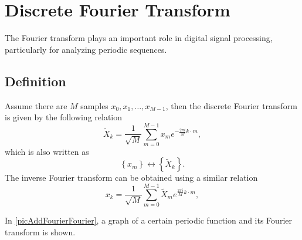 \section{Discrete Fourier Transform}
\label{AddFourier}

The Fourier transform plays an important role in digital signal processing, particularly for analyzing periodic sequences.
\subsection{Definition}
\begin{definition}
Assume there are $M$ samples $x_0, x_1, \dots, x_{M-1}$, then the discrete Fourier transform is given by the following relation
\begin{equation}
\tilde{X}_k = \frac{1}{\sqrt{M}}\sum^{M - 1}_{m = 0} x_m e^{-\frac{2 \pi i}{M} k\cdot m},
\label{eqAddFourierDiscretFourier}
\end{equation}
which is also written as
\begin{equation}
\left\{x_m\right\} \longleftrightarrow \left\{\tilde{X}_k\right\}.
\nonumber
\end{equation}
The inverse Fourier transform can be obtained using a similar relation
\begin{equation}
x_k = \frac{1}{\sqrt{M}}\sum^{M - 1}_{m = 0} \tilde{X}_m e^{\frac{2 \pi i}{M} k\cdot m},
\nonumber
\end{equation}
\end{definition}

In \autoref{picAddFourierFourier}, a graph of a certain periodic function and its Fourier transform is shown. 



